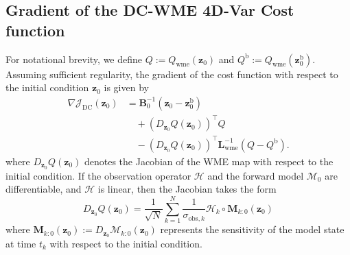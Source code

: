 \documentclass[final,1p,times]{elsarticle}
\begin{document}
\subsection{Gradient of the DC-WME 4D-Var Cost function}
For notational brevity, we define $Q := Q_{\mathrm{wme}}(\mathbf{z}_0)$ and $ Q^{\mathrm{b}} := Q_{\mathrm{wme}}(\mathbf{z}_0^{\mathrm{b}}) $. 
Assuming sufficient regularity, the gradient of the cost function with respect to the initial condition $ \mathbf{z}_0 $ is given by
\begin{equation}
\begin{split}
\nabla \mathcal{J}_{\mathrm{DC}}(\mathbf{z}_0) 
    &= \mathbf{B}_0^{-1} \left( \mathbf{z}_0 - \mathbf{z}_0^{\mathrm{b}} \right) \\
    &\quad + \left( D_{\mathbf{z}_0} Q(\mathbf{z}_0)\right)^\top Q \\
    &\quad - \left( D_{\mathbf{z}_0} Q(\mathbf{z}_0) \right)^\top 
        \mathbf{L}_{\mathrm{wme}}^{-1} \left( Q - Q^{\mathrm{b}} \right).
\end{split}
\end{equation}
where $ D_{\mathbf{z}_0} Q(\mathbf{z}_0) $ denotes the Jacobian of the WME map with respect to the initial condition. 
If the observation operator $ \mathcal{H} $ and the forward model $ \mathcal{M}_{0} $ are differentiable, and $ \mathcal{H} $ is linear, then the Jacobian takes the form
\begin{equation}
D_{\mathbf{z}_0} Q\left(\mathbf{z}_0\right)=\frac{1}{\sqrt{N}} \sum_{k=1}^{N} \frac{1}{\sigma_{\mathrm{obs}, k}} \mathcal{H}_k \circ \mathbf{M}_{k: 0}\left(\mathbf{z}_0\right)     \label{eq:wme_qoi_jacobian}
\end{equation}
where $\mathbf{M}_{k: 0}\left(\mathbf{z}_0\right):=D_{\mathbf{z}_0} \mathcal{M}_{k: 0}\left(\mathbf{z}_0\right)$ represents the sensitivity of the model state at time $t_k$ with respect to the initial condition.

\end{document}
